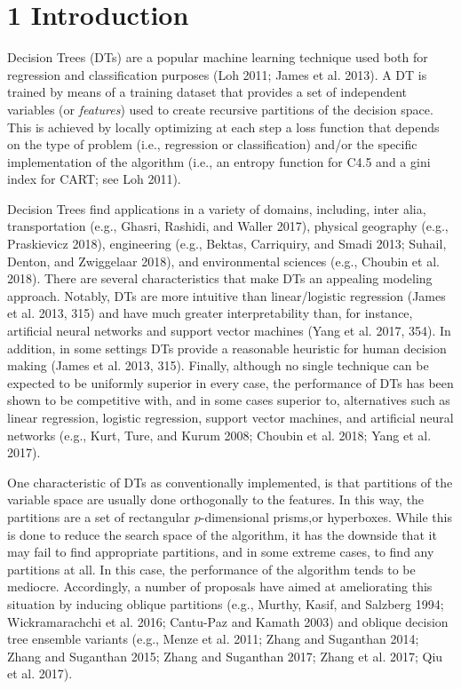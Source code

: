 \documentclass[]{elsarticle} %
\begin{document}
\section{1 Introduction}\label{introduction}

Decision Trees (DTs) are a popular machine learning technique used both
for regression and classification purposes (Loh 2011; James et al.
2013). A DT is trained by means of a training dataset that provides a
set of independent variables (or \emph{features}) used to create
recursive partitions of the decision space. This is achieved by locally
optimizing at each step a loss function that depends on the type of
problem (i.e., regression or classification) and/or the specific
implementation of the algorithm (i.e., an entropy function for C4.5 and
a gini index for CART; see Loh 2011).

Decision Trees find applications in a variety of domains, including,
inter alia, transportation (e.g., Ghasri, Rashidi, and Waller 2017),
physical geography (e.g., Praskievicz 2018), engineering (e.g., Bektas,
Carriquiry, and Smadi 2013; Suhail, Denton, and Zwiggelaar 2018), and
environmental sciences (e.g., Choubin et al. 2018). There are several
characteristics that make DTs an appealing modeling approach. Notably,
DTs are more intuitive than linear/logistic regression (James et al.
2013, 315) and have much greater interpretability than, for instance,
artificial neural networks and support vector machines (Yang et al.
2017, 354). In addition, in some settings DTs provide a reasonable
heuristic for human decision making (James et al. 2013, 315). Finally,
although no single technique can be expected to be uniformly superior in
every case, the performance of DTs has been shown to be competitive
with, and in some cases superior to, alternatives such as linear
regression, logistic regression, support vector machines, and artificial
neural networks (e.g., Kurt, Ture, and Kurum 2008; Choubin et al. 2018;
Yang et al. 2017).

One characteristic of DTs as conventionally implemented, is that
partitions of the variable space are usually done orthogonally to the
features. In this way, the partitions are a set of rectangular
\(p\)-dimensional prisms,or hyperboxes. While this is done to reduce the
search space of the algorithm, it has the downside that it may fail to
find appropriate partitions, and in some extreme cases, to find any
partitions at all. In this case, the performance of the algorithm tends
to be mediocre. Accordingly, a number of proposals have aimed at
ameliorating this situation by inducing oblique partitions (e.g.,
Murthy, Kasif, and Salzberg 1994; Wickramarachchi et al. 2016; Cantu-Paz
and Kamath 2003) and oblique decision tree ensemble variants (e.g.,
Menze et al. 2011; Zhang and Suganthan 2014; Zhang and Suganthan 2015;
Zhang and Suganthan 2017; Zhang et al. 2017; Qiu et al. 2017).
\end{document}
